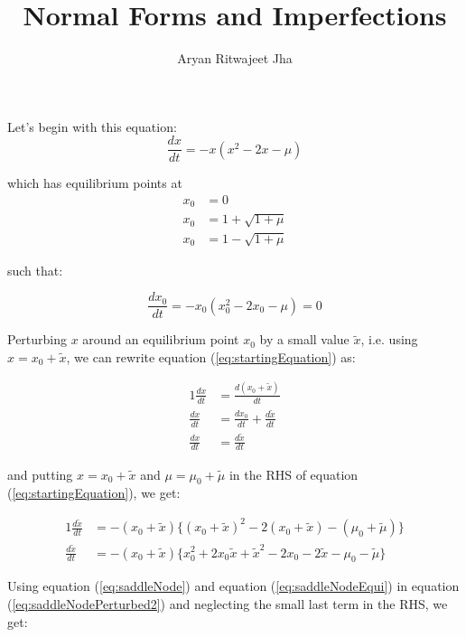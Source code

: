\documentclass{article}
\begin{document}
	\title{Normal Forms and Imperfections}
	\author{Aryan Ritwajeet Jha}
	\maketitle
	
	Let's begin with this equation: 
	\begin{equation}
		\label{eq:startingEquation}
		\frac{dx}{dt} = -x(x^2-2x-\mu)
	\end{equation}
	
	which has equilibrium points at	
	\begin{align*}
		x_0 &= 0 \\
		x_0 &= 1 +\sqrt{1+\mu} \\
		x_0 &= 1 -\sqrt{1+\mu}
	\end{align*} 
	
	such that:
	
	\begin{equation}
		\label{eq:startingEquationEqui}
		\frac{dx_0}{dt} = -x_0(x_0^2-2x_0-\mu) = 0 
	\end{equation}
	
	
	Perturbing $x$ around an equilibrium point $x_0$ by a small value $\tilde x$, i.e. using $x = x_0 + \tilde x$, we can rewrite equation (\ref{eq:startingEquation}) as:
	
	\begin{alignat}{1}
		\label{eq:saddleNodePerturbed}
		\frac{dx}{dt} &= \frac{d(x_0 + \tilde x)}{dt} \nonumber \\
		\frac{dx}{dt} &= \frac{dx_0}{dt} + \frac{d \tilde x}{dt} \\
		\frac{dx}{dt} &= \frac{d \tilde x}{dt} \nonumber
	\end{alignat}
	
	and putting $x = x_0 + \tilde x$ and $\mu = \mu_0 + \tilde{\mu}$ in the RHS of equation (\ref{eq:startingEquation}), we get:
	
	\begin{alignat}{1}
		\label{eq:saddleNodePerturbed2}
		\frac{d\tilde x}{dt} &= -(x_0+\tilde{x})\{(x_0+\tilde{x})^2-2(x_0+\tilde{x})-(\mu_0+\tilde{\mu})\} \nonumber \\
		\frac{d\tilde x}{dt} &= -(x_0+\tilde{x})\{x_0^2 + 2x_0\tilde{x} +\tilde{x}^2 -2x_0 -2\tilde{x}-\mu_0 -\tilde{\mu}\}
	\end{alignat}
	
	Using equation (\ref{eq:saddleNode}) and equation (\ref{eq:saddleNodeEqui}) in equation (\ref{eq:saddleNodePerturbed2}) and neglecting the small last term in the RHS, we get:
	
\end{document}
